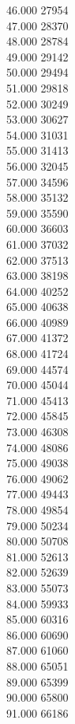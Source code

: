 { 46.000	27954 \\
 47.000	28370 \\
 48.000	28784 \\
 49.000	29142 \\
 50.000	29494 \\
 51.000	29818 \\
 52.000	30249 \\
 53.000	30627 \\
 54.000	31031 \\
 55.000	31413 \\
 56.000	32045 \\
 57.000	34596 \\
 58.000	35132 \\
 59.000	35590 \\
 60.000	36603 \\
 61.000	37032 \\
 62.000	37513 \\
 63.000	38198 \\
 64.000	40252 \\
 65.000	40638 \\
 66.000	40989 \\
 67.000	41372 \\
 68.000	41724 \\
 69.000	44574 \\
 70.000	45044 \\
 71.000	45413 \\
 72.000	45845 \\
 73.000	46308 \\
 74.000	48086 \\
 75.000	49038 \\
 76.000	49062 \\
 77.000	49443 \\
 78.000	49854 \\
 79.000	50234 \\
 80.000	50708 \\
 81.000	52613 \\
 82.000	52639 \\
 83.000	55073 \\
 84.000	59933 \\
 85.000	60316 \\
 86.000	60690 \\
 87.000	61060 \\
 88.000	65051 \\
 89.000	65399 \\
 90.000	65800 \\
 91.000	66186 \\
}
